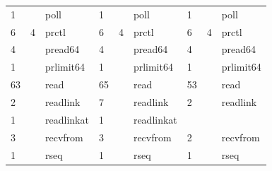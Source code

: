 \documentclass[submit,techreq,noauthor]{eco}	%
\begin{document}
\begin{table}[t]
\begin{tabular}{|lllllllll|}
  \multicolumn{1}{|l|}{1}     & \multicolumn{1}{l|}{}       & \multicolumn{1}{l|}{poll}              & \multicolumn{1}{l|}{1}     & \multicolumn{1}{l|}{}       & \multicolumn{1}{l|}{poll}              & \multicolumn{1}{l|}{1}     & \multicolumn{1}{l|}{}       & poll              \\
  \multicolumn{1}{|l|}{6}     & \multicolumn{1}{l|}{4}      & \multicolumn{1}{l|}{prctl}             & \multicolumn{1}{l|}{6}     & \multicolumn{1}{l|}{4}      & \multicolumn{1}{l|}{prctl}             & \multicolumn{1}{l|}{6}     & \multicolumn{1}{l|}{4}      & prctl             \\
  \multicolumn{1}{|l|}{4}     & \multicolumn{1}{l|}{}       & \multicolumn{1}{l|}{pread64}           & \multicolumn{1}{l|}{4}     & \multicolumn{1}{l|}{}       & \multicolumn{1}{l|}{pread64}           & \multicolumn{1}{l|}{4}     & \multicolumn{1}{l|}{}       & pread64           \\
  \multicolumn{1}{|l|}{1}     & \multicolumn{1}{l|}{}       & \multicolumn{1}{l|}{prlimit64}         & \multicolumn{1}{l|}{1}     & \multicolumn{1}{l|}{}       & \multicolumn{1}{l|}{prlimit64}         & \multicolumn{1}{l|}{1}     & \multicolumn{1}{l|}{}       & prlimit64         \\
  \multicolumn{1}{|l|}{63}    & \multicolumn{1}{l|}{}       & \multicolumn{1}{l|}{read}              & \multicolumn{1}{l|}{65}    & \multicolumn{1}{l|}{}       & \multicolumn{1}{l|}{read}              & \multicolumn{1}{l|}{53}    & \multicolumn{1}{l|}{}       & read              \\
  \multicolumn{1}{|l|}{2}     & \multicolumn{1}{l|}{}       & \multicolumn{1}{l|}{readlink}          & \multicolumn{1}{l|}{7}     & \multicolumn{1}{l|}{}       & \multicolumn{1}{l|}{readlink}          & \multicolumn{1}{l|}{2}     & \multicolumn{1}{l|}{}       & readlink          \\
  \multicolumn{1}{|l|}{1}     & \multicolumn{1}{l|}{}       & \multicolumn{1}{l|}{readlinkat}        & \multicolumn{1}{l|}{1}     & \multicolumn{1}{l|}{}       & \multicolumn{1}{l|}{readlinkat}        & \multicolumn{1}{l|}{}      & \multicolumn{1}{l|}{}       &                   \\
  \multicolumn{1}{|l|}{3}     & \multicolumn{1}{l|}{}       & \multicolumn{1}{l|}{recvfrom}          & \multicolumn{1}{l|}{3}     & \multicolumn{1}{l|}{}       & \multicolumn{1}{l|}{recvfrom}          & \multicolumn{1}{l|}{2}     & \multicolumn{1}{l|}{}       & recvfrom          \\
  \multicolumn{1}{|l|}{1}     & \multicolumn{1}{l|}{}       & \multicolumn{1}{l|}{rseq}              & \multicolumn{1}{l|}{1}     & \multicolumn{1}{l|}{}       & \multicolumn{1}{l|}{rseq}              & \multicolumn{1}{l|}{1}     & \multicolumn{1}{l|}{}       & rseq              \\

\end{tabular}
\end{table}
\end{document}
